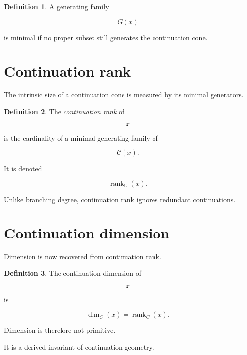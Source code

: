 \documentclass[13pt,openany]{book}
\theoremstyle{plain}
\theoremstyle{definition}
\newtheorem{definition}{Definition}[chapter]
\begin{document}
\begin{definition}

A generating family

\[
G(x)
\]

is minimal if no proper subset still generates the continuation cone.

\end{definition}


\section{Continuation rank}

The intrinsic size of a continuation cone is measured by its minimal generators.

\begin{definition}

The \emph{continuation rank} of

\[
x
\]

is the cardinality of a minimal generating family of

\[
\mathcal C(x).
\]

It is denoted

\[
\operatorname{rank}_C(x).
\]

\end{definition}

Unlike branching degree, continuation rank ignores redundant continuations.


\section{Continuation dimension}

Dimension is now recovered from continuation rank.

\begin{definition}

The continuation dimension of

\[
x
\]

is

\[
\dim_C(x)
=
\operatorname{rank}_C(x).
\]

\end{definition}

Dimension is therefore not primitive.

It is a derived invariant of continuation geometry.
\end{document}
